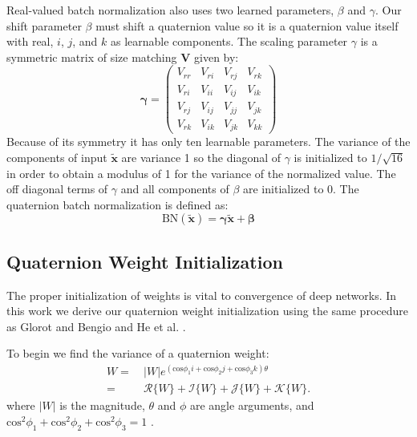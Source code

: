 \documentclass[14pt,a4paper]{article}
\begin{document}
Real-valued batch normalization also uses two learned parameters, $\beta$ and $\gamma$. 
Our shift parameter {\boldmath$\beta$} must shift a quaternion value so it is a quaternion value itself with real, $i$, $j$, and $k$ as learnable components. 
The scaling parameter {\boldmath$\gamma$} is a symmetric matrix of size matching $\textbf{V}$ given by:
\begin{equation}
\mathbf{\gamma}
=
\left( 
\begin{array}{cccc}
V_{rr} & V_{ri} & V_{rj} & V_{rk} \\
V_{ri} & V_{ii} & V_{ij} & V_{ik} \\
V_{rj} & V_{ij} & V_{jj} & V_{jk} \\
V_{rk} & V_{ik} & V_{jk} & V_{kk}
\end{array}
\right)
\label{eq:gamma}
\end{equation}
Because of its symmetry it has only ten learnable parameters. 
The variance of the components of input $\tilde{\textbf{x}}$ are variance 1 so the diagonal of {\boldmath$\gamma$} is initialized to $1/\sqrt{16}$ in order to obtain a modulus of 1 for the variance of the normalized value. 
The off diagonal terms of {\boldmath$\gamma$} and all components of {\boldmath$\beta$} are initialized to 0.
The quaternion batch normalization is defined as:
\begin{equation}
\mbox{BN}(\tilde{\textbf{x}}) = \mathbf{\gamma}\tilde{\textbf{x}} + \mathbf{\beta}
\label{eq:qbn}
\end{equation}


\subsection{Quaternion Weight Initialization}
The proper initialization of weights is vital to convergence of deep networks. 
In this work we derive our quaternion weight initialization using the same procedure as Glorot and Bengio \cite{glorot2010understanding} and He et al. \cite{he2015delving}.

To begin we find the variance of a quaternion weight:
\begin{align}
W = &~|W|e^{(\mbox{cos}\phi_1 \textit{i} + \mbox{cos}\phi_2 \textit{j} + \mbox{cos}\phi_3 \textit{k})\theta} \nonumber \\
= &~\mathscr{R}\{W\} + \mathscr{I}\{W\} + \mathscr{J}\{W\} + \mathscr{K}\{W\}.
\label{eq:quaternion_weight}
\end{align}
where $|W|$ is the magnitude, $\theta$ and $\phi$ are angle arguments, and $\mbox{cos}^2\phi_1 + \mbox{cos}^2\phi_2 + \mbox{cos}^2\phi_3 = 1$ \cite{turner2002}.
\end{document}
